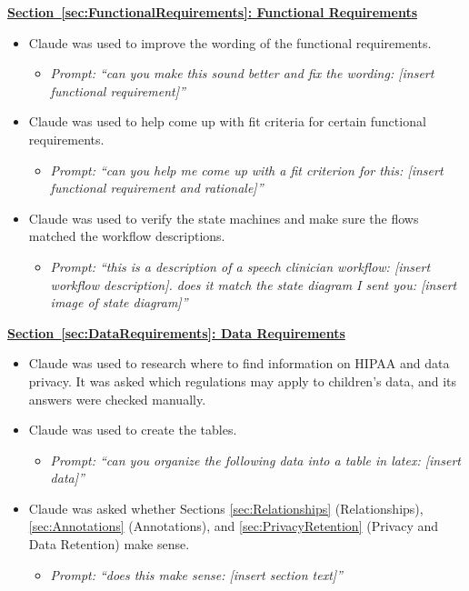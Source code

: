\documentclass[12pt]{article}
\begin{document}
\textbf{\hyperref[sec:FunctionalRequirements]{Section~\ref*{sec:FunctionalRequirements}: Functional Requirements}}
\begin{itemize}
  \item Claude was used to improve the wording of the functional requirements.
  \begin{itemize}
    \item \textit{Prompt: ``can you make this sound better and fix the wording: [insert functional requirement]''}
  \end{itemize}
  \item Claude was used to help come up with fit criteria for certain functional requirements.
  \begin{itemize}
    \item \textit{Prompt: ``can you help me come up with a fit criterion for this: [insert functional requirement and rationale]''}
  \end{itemize}
  \item Claude was used to verify the state machines and make sure the flows matched the workflow descriptions.
  \begin{itemize}
    \item \textit{Prompt: ``this is a description of a speech clinician workflow: [insert workflow description]. does it match the state diagram I sent you: [insert image of state diagram]''}
  \end{itemize}
\end{itemize}

\textbf{\hyperref[sec:DataRequirements]{Section~\ref*{sec:DataRequirements}: Data Requirements}}
\begin{itemize}
  \item Claude was used to research where to find information on HIPAA and data privacy. It was asked which regulations may apply to children's data, and its answers were checked manually.
  \item Claude was used to create the tables.
  \begin{itemize}
    \item \textit{Prompt: ``can you organize the following data into a table in latex: [insert data]''}
  \end{itemize}
  \item Claude was asked whether Sections \hyperref[sec:Relationships]{\ref*{sec:Relationships}} (Relationships), \hyperref[sec:Annotations]{\ref*{sec:Annotations}} (Annotations), and \hyperref[sec:PrivacyRetention]{\ref*{sec:PrivacyRetention}} (Privacy and Data Retention) make sense.
  \begin{itemize}
    \item \textit{Prompt: ``does this make sense: [insert section text]''}
  \end{itemize}
\end{itemize}
\end{document}
